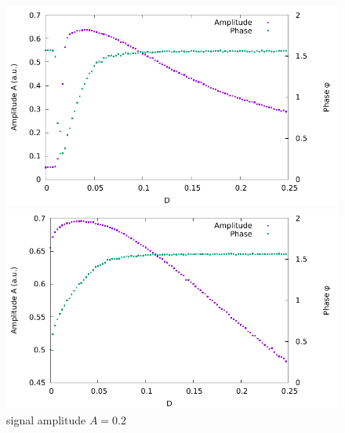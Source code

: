\documentclass[10pt,fleqn,%
reqno,a4paper]{article}
\begin{document}
\begin{figure}[htpb]
	\begin{minipage}[b]{0.5\linewidth}
		\includegraphics[width=\linewidth]{gnuplot_pictures/final_pictures/ampl_0p2_phase.pdf}
		\caption{signal amplitude $A=0.2$} 
	\end{minipage} 
	\begin{minipage}[b]{0.5\linewidth}
		\includegraphics[width=\linewidth]{gnuplot_pictures/final_pictures/ampl_0p4_phase.pdf} 
	\end{minipage} 


\end{figure}
\end{document}
